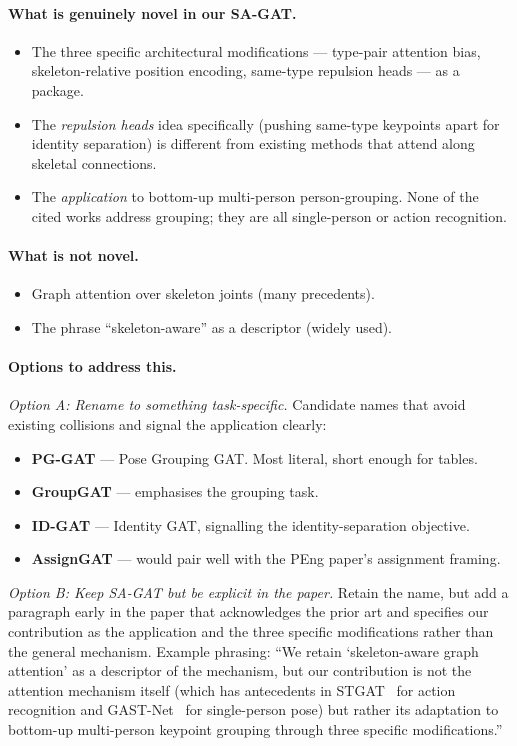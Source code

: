\paragraph{What is genuinely novel in our SA-GAT.}
\begin{itemize}
    \item The three specific architectural modifications --- type-pair attention bias, skeleton-relative position encoding, same-type repulsion heads --- as a package.
    \item The \emph{repulsion heads} idea specifically (pushing same-type keypoints apart for identity separation) is different from existing methods that attend along skeletal connections.
    \item The \emph{application} to bottom-up multi-person person-grouping. None of the cited works address grouping; they are all single-person or action recognition.
\end{itemize}

\paragraph{What is not novel.}
\begin{itemize}
    \item Graph attention over skeleton joints (many precedents).
    \item The phrase ``skeleton-aware'' as a descriptor (widely used).
\end{itemize}

\paragraph{Options to address this.}

\emph{Option A: Rename to something task-specific.} Candidate names that avoid existing collisions and signal the application clearly:
\begin{itemize}
    \item \textbf{PG-GAT} --- Pose Grouping GAT. Most literal, short enough for tables.
    \item \textbf{GroupGAT} --- emphasises the grouping task.
    \item \textbf{ID-GAT} --- Identity GAT, signalling the identity-separation objective.
    \item \textbf{AssignGAT} --- would pair well with the PEng paper's assignment framing.
\end{itemize}

\emph{Option B: Keep SA-GAT but be explicit in the paper.} Retain the name, but add a paragraph early in the paper that acknowledges the prior art and specifies our contribution as the application and the three specific modifications rather than the general mechanism. Example phrasing: ``We retain `skeleton-aware graph attention' as a descriptor of the mechanism, but our contribution is not the attention mechanism itself (which has antecedents in STGAT~\cite{hu2023stgat} for action recognition and GAST-Net~\cite{liu2020gastnet} for single-person pose) but rather its adaptation to bottom-up multi-person keypoint grouping through three specific modifications.''

